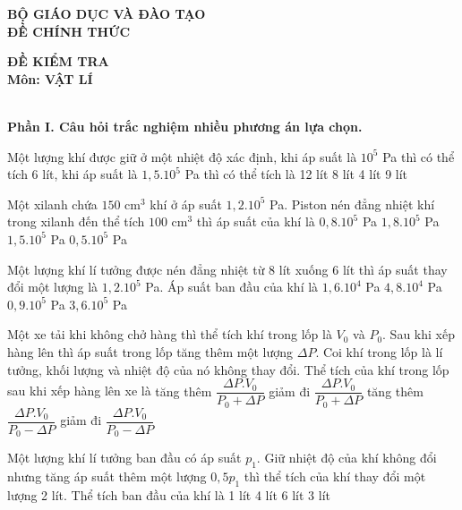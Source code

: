 \documentclass[12pt,a4paper]{article}
\begin{document}
\begin{minipage}[t]{7cm}
	\begin{center}
		\textbf{BỘ GIÁO DỤC VÀ ĐÀO TẠO \\[3pt]
			ĐỀ CHÍNH THỨC}
	\end{center}
\end{minipage}
\hspace{3cm}
\begin{minipage}[t]{7cm}
	\begin{center}
		\textbf{ĐỀ KIỂM TRA\\[3pt]
			Môn: VẬT LÍ}
	\end{center}
\end{minipage}\\[6pt]

\textbf{Phần I. Câu hỏi trắc nghiệm nhiều phương án lựa chọn.}

\begin{ex}
	Một lượng khí được giữ ở một nhiệt độ xác định, khi áp suất là $10^5$ Pa thì có thể tích 6 lít, khi áp suất là $1,5.10^5$ Pa thì có thể tích là
	\choice
	{12 lít}
	{8 lít}
	{4 lít}
	{9 lít}
\end{ex}

\begin{ex}
	Một xilanh chứa $150 \text{ cm}^3$ khí ở áp suất $1,2.10^5$ Pa. Piston nén đẳng nhiệt khí trong xilanh đến thể tích $100 \text{ cm}^3$ thì áp suất của khí là
	\choice
	{$0,8.10^5$ Pa}
	{$1,8.10^5$ Pa}
	{$1,5.10^5$ Pa}
	{$0,5.10^5$ Pa}
\end{ex}

\begin{ex}
	Một lượng khí lí tưởng được nén đẳng nhiệt từ 8 lít xuống 6 lít thì áp suất thay đổi một lượng là $1,2.10^5$ Pa. Áp suất ban đầu của khí là
	\choice
	{$1,6.10^4$ Pa}
	{$4,8.10^4$ Pa}
	{$0,9.10^5$ Pa}
	{$3,6.10^5$ Pa}
\end{ex}

\begin{ex}
	Một xe tải khi không chở hàng thì thể tích khí trong lốp là $V_0$ và $P_0$. Sau khi xếp hàng lên thì áp suất trong lốp tăng thêm một lượng $\Delta P$. Coi khí trong lốp là lí tưởng, khối lượng và nhiệt độ của nó không thay đổi. Thể tích của khí trong lốp sau khi xếp hàng lên xe là
	\choice
	{tăng thêm $\dfrac{\Delta P.V_0}{P_0 + \Delta P}$}
	{giảm đi $\dfrac{\Delta P.V_0}{P_0 + \Delta P}$}
	{tăng thêm $\dfrac{\Delta P.V_0}{P_0 - \Delta P}$}
	{giảm đi $\dfrac{\Delta P.V_0}{P_0 - \Delta P}$}
\end{ex}

\begin{ex}
	Một lượng khí lí tưởng ban đầu có áp suất $p_1$. Giữ nhiệt độ của khí không đổi nhưng tăng áp suất thêm một lượng $0,5p_1$ thì thể tích của khí thay đổi một lượng 2 lít. Thể tích ban đầu của khí là
	\choice
	{1 lít}
	{4 lít}
	{6 lít}
	{3 lít}
\end{ex}
\end{document}
